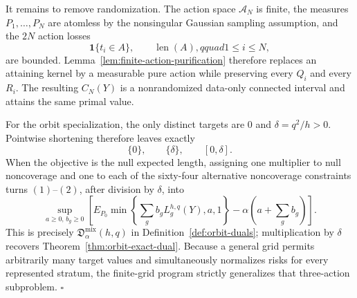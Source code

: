 It remains to remove randomization.  The action space \(\mathcal A_N\) is finite, the measures \(P_1,\ldots,P_N\) are atomless by the nonsingular Gaussian sampling assumption, and the \(2N\) action losses
\[
 \mathbf1\{t_i\in A\},\qquad \operatorname{len}(A),qquad 1\leq i\leq N,
\]
are bounded.  Lemma~\ref{lem:finite-action-purification} therefore replaces an attaining kernel by a measurable pure action while preserving every \(Q_i\) and every \(R_i\).  The resulting \(C_N(Y)\) is a nonrandomized data-only connected interval and attains the same primal value.

For the orbit specialization, the only distinct targets are \(0\) and \(\delta=q^2/h>0\).  Pointwise shortening therefore leaves exactly
\[
 \{0\},\qquad \{\delta\},\qquad [0,\delta].
\]
When the objective is the null expected length, assigning one multiplier to null noncoverage and one to each of the sixty-four alternative noncoverage constraints turns \((1)\)--\((2)\), after division by \(\delta\), into
\[
 \sup_{a\geq0,\,b_g\geq0}
 \left[
 E_{P_0}\min\left\{\sum_gb_gL_g^{h,q}(Y),a,1\right\}
 -\alpha\left(a+\sum_gb_g\right)
 \right].
\]
This is precisely \(\mathfrak D_\alpha^{\mathrm{mix}}(h,q)\) in Definition~\ref{def:orbit-duals}; multiplication by \(\delta\) recovers Theorem~\ref{thm:orbit-exact-dual}.  Because a general grid permits arbitrarily many target values and simultaneously normalizes risks for every represented stratum, the finite-grid program strictly generalizes that three-action subproblem. \(\square\)